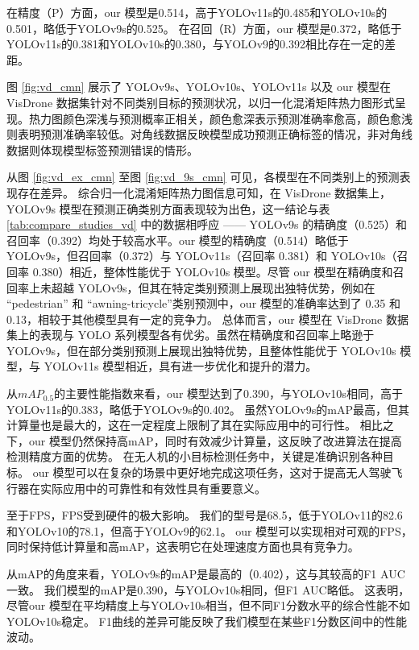 在精度（P）方面，our 模型是0.514，高于YOLOv11s的0.485和YOLOv10s的0.501，略低于YOLOv9s的0.525。 在召回（R）方面，our 模型是0.372，略低于YOLOv11s的0.381和YOLOv10s的0.380，与YOLOv9的0.392相比存在一定的差距。

图 \ref{fig:vd_cmn} 展示了 YOLOv9s、YOLOv10s、YOLOv11s 以及 our 模型在 VisDrone 数据集针对不同类别目标的预测状况，以归一化混淆矩阵热力图形式呈现。热力图颜色深浅与预测概率正相关，颜色愈深表示预测准确率愈高，颜色愈浅则表明预测准确率较低。对角线数据反映模型成功预测正确标签的情况，非对角线数据则体现模型标签预测错误的情形。

从图 \ref{fig:vd_ex_cmn} 至图 \ref{fig:vd_9s_cmn} 可见，各模型在不同类别上的预测表现存在差异。
综合归一化混淆矩阵热力图信息可知，在 VisDrone 数据集上，YOLOv9s 模型在预测正确类别方面表现较为出色，这一结论与表 \ref{tab:compare_studies_vd} 中的数据相呼应 —— YOLOv9s 的精确度（0.525）和召回率（0.392）均处于较高水平。our 模型的精确度（0.514）略低于 YOLOv9s，但召回率（0.372）与 YOLOv11s（召回率 0.381）和 YOLOv10s（召回率 0.380）相近，整体性能优于 YOLOv10s 模型。尽管 our 模型在精确度和召回率上未超越 YOLOv9s，但其在特定类别预测上展现出独特优势，例如在 “pedestrian” 和 “awning-tricycle”类别预测中，our 模型的准确率达到了 0.35 和 0.13，相较于其他模型具有一定的竞争力。
总体而言，our 模型在 VisDrone 数据集上的表现与 YOLO 系列模型各有优劣。虽然在精确度和召回率上略逊于 YOLOv9s，但在部分类别预测上展现出独特优势，且整体性能优于 YOLOv10s 模型，与 YOLOv11s 模型相近，具有进一步优化和提升的潜力。

从$mAP_{0.5}$的主要性能指数来看，our 模型达到了0.390，与YOLOv10s相同，高于YOLOv11s的0.383，略低于YOLOv9s的0.402。 虽然YOLOv9s的mAP最高，但其计算量也是最大的，这在一定程度上限制了其在实际应用中的可行性。 相比之下，our 模型仍然保持高mAP，同时有效减少计算量，这反映了改进算法在提高检测精度方面的优势。 在无人机的小目标检测任务中，关键是准确识别各种目标。 our 模型可以在复杂的场景中更好地完成这项任务，这对于提高无人驾驶飞行器在实际应用中的可靠性和有效性具有重要意义。

至于FPS，FPS受到硬件的极大影响。 我们的型号是68.5，低于YOLOv11的82.6和YOLOv10的78.1，但高于YOLOv9的62.1。 our 模型可以实现相对可观的FPS，同时保持低计算量和高mAP，这表明它在处理速度方面也具有竞争力。

从mAP的角度来看，YOLOv9s的mAP是最高的（0.402），这与其较高的F1 AUC一致。 我们模型的mAP是0.390，与YOLOv10s相同，但F1 AUC略低。 这表明，尽管our 模型在平均精度上与YOLOv10s相当，但不同F1分数水平的综合性能不如YOLOv10s稳定。 F1曲线的差异可能反映了我们模型在某些F1分数区间中的性能波动。

